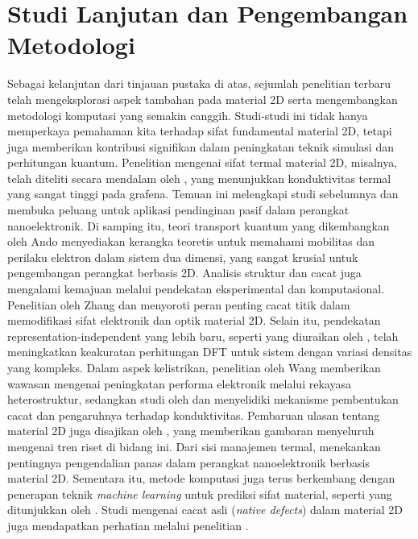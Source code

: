 \section{Studi Lanjutan dan Pengembangan Metodologi}
Sebagai kelanjutan dari tinjauan pustaka di atas, sejumlah penelitian terbaru telah mengeksplorasi aspek tambahan pada material 2D serta mengembangkan metodologi komputasi yang semakin canggih.
Studi-studi ini tidak hanya memperkaya pemahaman kita terhadap sifat fundamental material 2D, tetapi juga memberikan kontribusi signifikan dalam peningkatan teknik simulasi dan perhitungan kuantum.
Penelitian mengenai sifat termal material 2D, misalnya, telah diteliti secara mendalam oleh \citep{Khan2017}, yang menunjukkan konduktivitas termal yang sangat tinggi pada grafena.
Temuan ini melengkapi studi sebelumnya dan membuka peluang untuk aplikasi pendinginan pasif dalam perangkat nanoelektronik.
Di samping itu, teori transport kuantum yang dikembangkan oleh Ando \citep{Ando2002} menyediakan kerangka teoretis untuk memahami mobilitas dan perilaku elektron dalam sistem dua dimensi, yang sangat krusial untuk pengembangan perangkat berbasis 2D.
Analisis struktur dan cacat juga mengalami kemajuan melalui pendekatan eksperimental dan komputasional.
Penelitian oleh Zhang \citep{Zhang2020} dan \citep{Slotman2013} menyoroti peran penting cacat titik dalam memodifikasi sifat elektronik dan optik material 2D.
Selain itu, pendekatan representation-independent yang lebih baru, seperti yang diuraikan oleh \citep{Shen2022}, telah meningkatkan keakuratan perhitungan DFT untuk sistem dengan variasi densitas yang kompleks.
Dalam aspek kelistrikan, penelitian oleh Wang \citep{Wang2017} memberikan wawasan mengenai peningkatan performa elektronik melalui rekayasa heterostruktur, sedangkan studi oleh \citep{Munro2020} dan \citep{Huang2012} menyelidiki mekanisme pembentukan cacat dan pengaruhnya terhadap konduktivitas.
Pembaruan ulasan tentang material 2D juga disajikan oleh \citep{Bhimanapati2016}, yang memberikan gambaran menyeluruh mengenai tren riset di bidang ini.
Dari sisi manajemen termal, \citep{Khan2017} menekankan pentingnya pengendalian panas dalam perangkat nanoelektronik berbasis material 2D.
Sementara itu, metode komputasi juga terus berkembang dengan penerapan teknik \emph{machine learning} untuk prediksi sifat material, seperti yang ditunjukkan oleh \citep{Zheng2025}.
Studi mengenai cacat asli (\emph{native defects}) dalam material 2D juga mendapatkan perhatian melalui penelitian \citep{Weston2018}.
